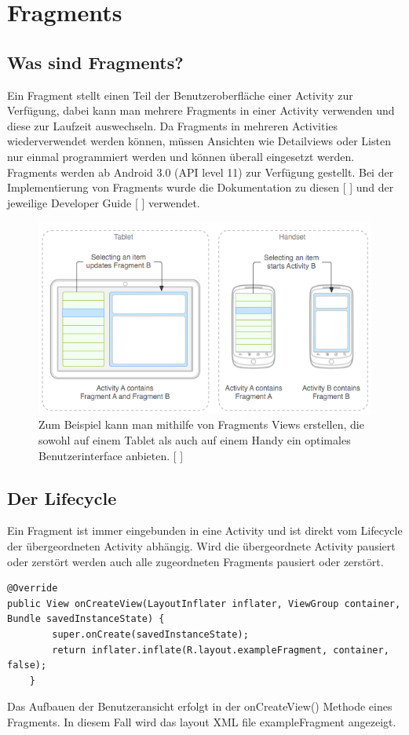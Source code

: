 \documentclass[FIPLY_base.tex]{subfiles}
\author{Andreas Denkmayr}
\date{20. Dezember 2015}
\begin{document}
\section{Fragments}
\subsection{Was sind Fragments?}
Ein Fragment stellt einen Teil der Benutzeroberfläche einer Activity zur Verfügung, dabei kann man mehrere Fragments in einer Activity verwenden und diese zur Laufzeit auswechseln.
Da Fragments in mehreren Activities wiederverwendet werden können, müssen Ansichten wie Detailviews oder Listen nur einmal programmiert werden und können überall eingesetzt werden.
Fragments werden ab Android 3.0 (API level 11) zur Verfügung gestellt. \newline
Bei der Implementierung von Fragments wurde die Dokumentation zu diesen [ \cite{adFragments}] und der jeweilige Developer Guide [ \cite{adFragmentsGuide}] verwendet. 

\begin{figure}[h]
\includegraphics[scale=0.60]{img/fragments_modules}
\caption{Zum Beispiel kann man mithilfe von Fragments Views erstellen, die sowohl auf einem Tablet als auch auf einem Handy ein optimales Benutzerinterface anbieten. [ \cite{adFragmentsGuide}]}
\end{figure}

\newpage
\subsection{Der Lifecycle}
Ein Fragment ist immer eingebunden in eine Activity und ist direkt vom Lifecycle der übergeordneten Activity abhängig.
Wird die übergeordnete Activity pausiert oder zerstört werden auch alle zugeordneten Fragments pausiert oder zerstört.
\ \\
\begin{lstlisting}
@Override
public View onCreateView(LayoutInflater inflater, ViewGroup container, Bundle savedInstanceState) {
        super.onCreate(savedInstanceState);
        return inflater.inflate(R.layout.exampleFragment, container, false);
    }
\end{lstlisting}
Das Aufbauen der Benutzeransicht erfolgt in der onCreateView() Methode eines Fragments. In diesem Fall wird das layout XML file exampleFragment angezeigt.
\end{document}
